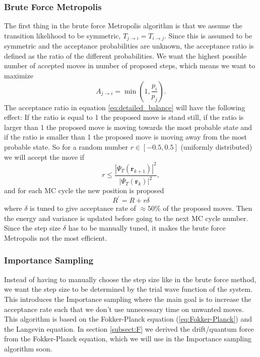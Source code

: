 \documentclass[12pt,a4paper,english]{article}
\begin{document}
\subsubsection{Brute Force Metropolis}
\label{subsubsect:brute_Metropolis}
The first thing in the brute force Metropolis algorithm is that we assume the transition likelihood to be symmetric, $T_{j\rightarrow i}=T_{i\rightarrow j}$. Since this is assumed to be symmetric and the acceptance probabilities are unknown, the acceptance ratio is defined as the ratio of the different probabilities. We want the highest possible number of accepted moves in number of proposed steps, which means we want to maximize 
\[A_{j\rightarrow i}=\min(1, \frac{p_i}{p_j}).\] 
The acceptance ratio in equation \ref{eq:detailed_balance} will have the following effect: If the ratio is equal to 1 the proposed move is stand still, if the ratio is larger than 1 the proposed move is moving towards the most probable state and if the ratio is smaller than 1 the proposed move is moving away from the most probable state. So for a random number $r\in[-0.5,0.5]$ (uniformly distributed) we will accept the move if
\begin{equation}
\label{eq:brute_accept_move}
r\leq\frac{|\Psi_T(\textbf{r}_{k+1})|^2}{|\Psi_T(\textbf{r}_k)|^2},
\end{equation}
and for each MC cycle the new position is proposed \[R^{\prime}=R+r\delta\]
where $\delta$ is tuned to give acceptance rate of $\approx50$\% of the proposed moves. Then the energy and variance is updated before going to the next MC cycle number. Since the step size $\delta$ has to be manually tuned, it makes the brute force Metropolis not the most efficient.

\subsubsection{Importance Sampling}
\label{subsubsect:Importance}
Instead of having to manually choose the step size like in the brute force method, we want the step size to be determined by the trial wave function of the system. This introduces the Importance sampling where the main goal is to increase the acceptance rate such that we don't use unnecessary time on unwanted moves. This algorithm is based on the Fokker-Planck equation (\ref{eq:Fokker-Planck}) and the Langevin equation. In section \ref{subsect:F} we derived the drift/quantum force from the Fokker-Planck equation, which we will use in the Importance sampling algorithm soon.
\end{document}
